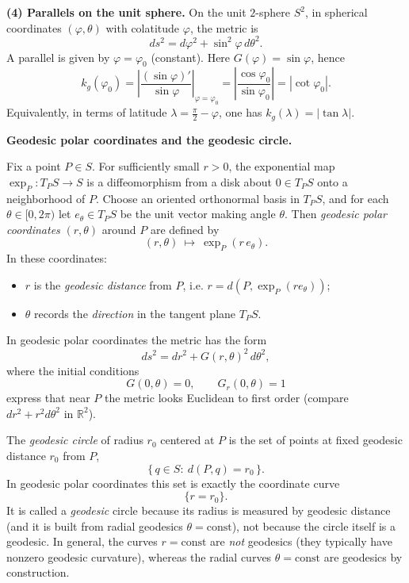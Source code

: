 \begin{solution}
\medskip
\noindent\textbf{(4) Parallels on the unit sphere.}
On the unit \(2\)-sphere \(S^{2}\), in spherical coordinates \((\varphi,\theta)\) with colatitude
\(\varphi\), the metric is
\[
ds^{2}=d\varphi^{2}+\sin^{2}\varphi\,d\theta^{2}.
\]
A parallel is given by \(\varphi=\varphi_{0}\) (constant). Here \(G(\varphi)=\sin\varphi\), hence
\[
k_{g}(\varphi_{0})=\left|\frac{(\sin\varphi)'}{\sin\varphi}\right|_{\varphi=\varphi_{0}}
=\left|\frac{\cos\varphi_{0}}{\sin\varphi_{0}}\right|
=|\cot\varphi_{0}|.
\]
Equivalently, in terms of latitude \(\lambda=\frac{\pi}{2}-\varphi\), one has \(k_{g}(\lambda)=|\tan\lambda|\).

\par\medskip\noindent\textbf{Geodesic polar coordinates and the geodesic circle.}\par\smallskip

Fix a point \(P\in S\). For sufficiently small \(r>0\), the exponential map
\(\exp_{P}\colon T_{P}S\to S\) is a diffeomorphism from a disk about \(0\in T_{P}S\) onto a
neighborhood of \(P\). Choose an oriented orthonormal basis in \(T_{P}S\), and for each
\(\theta\in[0,2\pi)\) let \(e_{\theta}\in T_{P}S\) be the unit vector making angle \(\theta\).
Then \emph{geodesic polar coordinates} \((r,\theta)\) around \(P\) are defined by
\[
(r,\theta)\ \longmapsto\ \exp_{P}(r\,e_{\theta}).
\]
In these coordinates:
\begin{itemize}
	\item \(r\) is the \emph{geodesic distance} from \(P\), i.e. \(r=d(P,\exp_{P}(r e_{\theta}))\);
	\item \(\theta\) records the \emph{direction} in the tangent plane \(T_{P}S\).
\end{itemize}

In geodesic polar coordinates the metric has the form
\[
ds^{2}=dr^{2}+G(r,\theta)^{2}\,d\theta^{2},
\]
where the initial conditions
\[
G(0,\theta)=0,\qquad G_{r}(0,\theta)=1
\]
express that near \(P\) the metric looks Euclidean to first order (compare \(dr^{2}+r^{2}d\theta^{2}\) in
\(\mathbb{R}^{2}\)).

\medskip
\noindent The \emph{geodesic circle} of radius \(r_{0}\) centered at \(P\) is the set of points at
fixed geodesic distance \(r_{0}\) from \(P\),
\[
\{\,q\in S:\ d(P,q)=r_{0}\,\}.
\]
In geodesic polar coordinates this set is exactly the coordinate curve
\[
\{r=r_{0}\}.
\]
It is called a \emph{geodesic} circle because its radius is measured by geodesic distance (and it is
built from radial geodesics \(\theta=\mathrm{const}\)), not because the circle itself is a geodesic.
In general, the curves \(r=\mathrm{const}\) are \emph{not} geodesics (they typically have nonzero
geodesic curvature), whereas the radial curves \(\theta=\mathrm{const}\) are geodesics by construction.


\end{solution}

